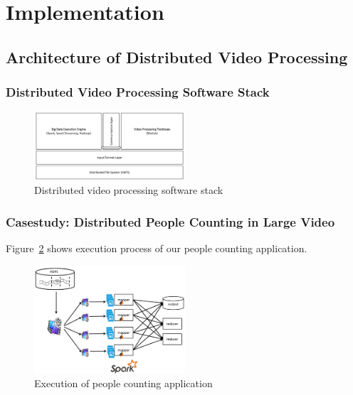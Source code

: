 \section{Implementation}
\label{sec:sec_algorithm}

\subsection{Architecture of Distributed Video Processing}

\subsubsection{Distributed Video Processing Software Stack}

\begin{figure}[htbp!]\centering
\vspace{-1ex}
\includegraphics[width=0.5\textwidth]{figures/softwarestack.pdf}
\vspace{-4ex}
\caption{Distributed video processing software stack}
\label{fig:overview}
\end{figure}

\subsubsection{Casestudy: Distributed People Counting in Large Video}

Figure~\ref{fig:overview} shows execution process of our people counting
application.

\begin{figure}[htbp!]\centering
\vspace{-1ex}
\includegraphics[width=0.5\textwidth]{figures/overview.pdf}
\vspace{-4ex}
\caption{Execution of people counting application}
\label{fig:overview}
\end{figure}

